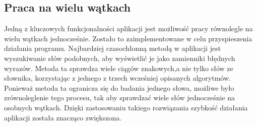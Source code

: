 \subsection{Praca na wielu wątkach}

Jedną z kluczowych funkcjonalności aplikacji jest możliwość pracy równolegle na wielu wątkach jednocześnie. Zostało to zaimplementowane w celu przyspieszenia działania programu. Najbardziej czasochłonną metodą w aplikacji jest wyszukiwanie słów podobnych, aby wyświetlić je jako zamienniki błędnych wyrazów. Metoda ta sprawdza wiele ciągów znakowych,a nie tylko słów ze słownika, korzystając z jednego z trzech wcześniej opisanych algorytmów. Ponieważ metoda ta ogranicza się do badania jednego słowa, możliwe było zrównoleglenie tego procesu, tak aby sprawdzać wiele słów jednocześnie na osobnych wątkach. Dzięki zastosowaniu takiego rozwiązania szybkość działania aplikacji została znacząco zwiększona.

